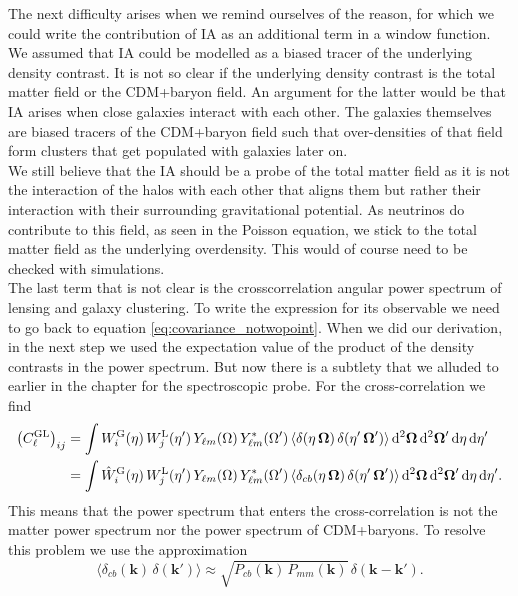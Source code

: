 \documentclass[../main.tex]{subfiles}
\begin{document}
 The next difficulty arises when we remind ourselves of the reason, for which we could write the contribution of IA as an additional term in a window function. We assumed that IA could be modelled as a biased tracer of the underlying density contrast. It is not so clear if the underlying density contrast is the total matter field or the CDM+baryon field. An argument for the latter would be that IA arises when close galaxies interact with each other. The galaxies themselves are biased tracers of the CDM+baryon field such that over-densities of that field form clusters that get populated with galaxies later on.\\
 We still believe that the IA should be a probe of the total matter field as it is not the interaction of the halos with each other that aligns them but rather their interaction with their surrounding gravitational potential. As neutrinos do contribute to this field, as seen in the Poisson equation, we stick to the total matter field as the underlying overdensity. This would of course need to be checked with simulations.\\
 The last term that is not clear is the crosscorrelation angular power spectrum of lensing and galaxy clustering. To write the expression for its observable we need to go back to equation \ref{eq:covariance_notwopoint}. When we did our derivation, in the next step we used the expectation value of the product of the density contrasts in the power spectrum. But now there is a subtlety that we alluded to earlier in the chapter for the spectroscopic probe. For the cross-correlation we find 
\begin{align}
    \left(C^\mathrm{GL}_{\ell}\right)_{ij}&= \int W_i^\mathrm{G}(\eta)\, W_j^\mathrm{L}(\eta')\, Y_{\ell m}(\Omega) \, Y^*_{\ell m}(\Omega')\, \langle \delta(\eta\,\boldsymbol{\Omega})\,\delta(\eta'\,\boldsymbol{\Omega}') \rangle\, \mathrm{d}^2 \boldsymbol{\Omega} \, \mathrm{d}^2 \boldsymbol{\Omega}' \,\mathrm{d} \eta\, \mathrm{d} \eta' \nonumber \\
    &= \int \hat{W}_i^\mathrm{G}(\eta)\, W_j^\mathrm{L}(\eta')\, Y_{\ell m}(\Omega) \, Y^*_{\ell m}(\Omega')\, \langle \delta_{cb}(\eta\,\boldsymbol{\Omega})\,\delta(\eta'\,\boldsymbol{\Omega}') \rangle\, \mathrm{d}^2 \boldsymbol{\Omega} \, \mathrm{d}^2 \boldsymbol{\Omega}' \,\mathrm{d} \eta\, \mathrm{d} \eta'.
\end{align} 
This means that the power spectrum that enters the cross-correlation is not the matter power spectrum nor the power spectrum of CDM+baryons. To resolve this problem we use the approximation \begin{equation}
    \langle \delta_{cb}(\boldsymbol{k})\,\delta(\boldsymbol{k}') \rangle \approx \sqrt{P_{cb}(\boldsymbol{k})\,P_{mm}(\boldsymbol{k})}\,\delta(\boldsymbol{k}-\boldsymbol{k}').
\end{equation}
\end{document}
